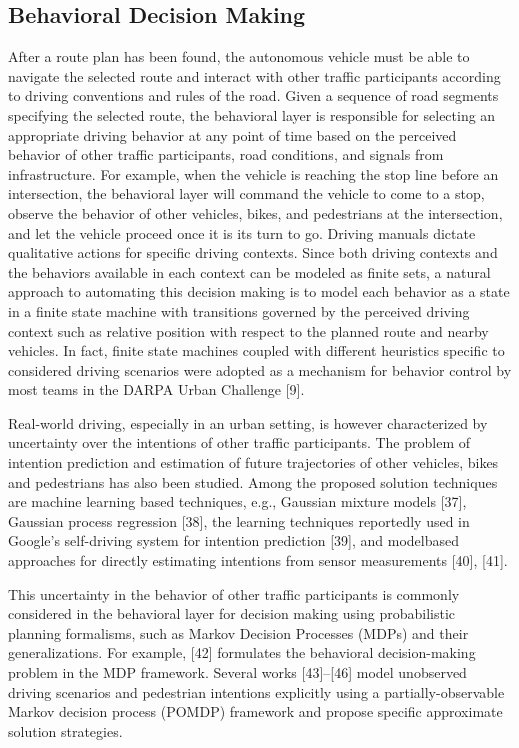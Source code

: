 \subsection{Behavioral Decision Making}
After a route plan has been found, the autonomous vehicle must be able to navigate the selected route and interact with other traffic participants according to driving conventions and rules of the road. Given a sequence of road segments specifying the selected route, the behavioral layer is responsible for selecting an appropriate driving behavior at any point of time based on the perceived behavior of other traffic participants, road conditions, and signals from infrastructure. For example, when the vehicle is reaching the stop line before an intersection, the behavioral layer will command the vehicle to come to a stop, observe the behavior of other vehicles, bikes, and pedestrians at the intersection, and let the vehicle proceed once it is its turn to go. Driving manuals dictate qualitative actions for specific driving contexts. Since both driving contexts and the behaviors available in each context can be modeled as finite sets, a natural approach to automating this decision making is to model each behavior as a state in a finite state machine with transitions governed by the perceived driving context such as relative position with respect to the planned route and nearby vehicles. In fact, finite state machines coupled with different heuristics specific to considered driving scenarios were adopted as a mechanism for behavior control by most teams in the DARPA Urban Challenge [9].

Real-world driving, especially in an urban setting, is however characterized by uncertainty over the intentions of other traffic participants. The problem of intention prediction and estimation of future trajectories of other vehicles, bikes and pedestrians has also been studied. Among the proposed solution techniques are machine learning based techniques, e.g., Gaussian mixture models [37], Gaussian process regression [38], the learning techniques reportedly used in Google’s self-driving system for intention prediction [39], and modelbased approaches for directly estimating intentions from sensor measurements [40], [41].

This uncertainty in the behavior of other traffic participants is commonly considered in the behavioral layer for decision making using probabilistic planning formalisms, such as Markov Decision Processes (MDPs) and their generalizations. For example, [42] formulates the behavioral decision-making problem in the MDP framework. Several works [43]–[46] model unobserved driving scenarios and pedestrian intentions explicitly using a partially-observable Markov decision process (POMDP) framework and propose specific approximate solution strategies.

